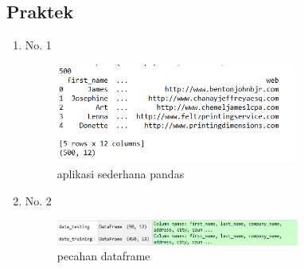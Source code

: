 \subsection{Praktek}
\begin{enumerate}
\item No. 1
	\hfill\\
	
\begin{figure}[H]
    \includegraphics[width=8cm]{figures/1174084/4/1.png}
    \centering
    \caption{aplikasi sederhana pandas}
\end{figure}

\item No. 2
	\hfill\\
	
\begin{figure}[H]
    \includegraphics[width=8cm]{figures/1174084/4/2.png}
    \centering
    \caption{pecahan dataframe}
\end{figure}


\end{enumerate}
